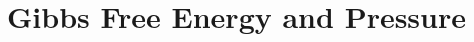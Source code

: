 \documentclass[../hand-in3.tex]{subfiles}
\begin{document}
\section{Gibbs Free Energy and Pressure}
\end{document}
